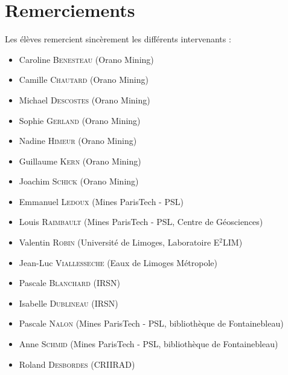 \documentclass{article}
\begin{document}
\section*{Remerciements}
Les élèves remercient sincèrement les différents intervenants : 
\begin{itemize}
    \item Caroline \textsc{Benesteau} (Orano Mining)
    \item Camille \textsc{Chautard} (Orano Mining)
    \item Michael \textsc{Descostes} (Orano Mining)    
    \item Sophie \textsc{Gerland} (Orano Mining)
    \item Nadine \textsc{Himeur} (Orano Mining)
    \item Guillaume \textsc{Kern} (Orano Mining)
    \item Joachim \textsc{Schick} (Orano Mining)
    \item Emmanuel \textsc{Ledoux} (Mines ParisTech - PSL)
    \item Louis \textsc{Raimbault} (Mines ParisTech - PSL, Centre de Géosciences) 
    \item Valentin \textsc{Robin} (Université de Limoges, Laboratoire E$^2$LIM) 
    \item Jean-Luc \textsc{Viallesseche} (Eaux de Limoges Métropole)
    \item Pascale \textsc{Blanchard} (IRSN)  
    \item Isabelle \textsc{Dublineau} (IRSN)    
    \item Pascale \textsc{Nalon} (Mines ParisTech - PSL, bibliothèque de Fontainebleau)
    \item Anne \textsc{Schmid} (Mines ParisTech - PSL, bibliothèque de Fontainebleau)
    \item Roland \textsc{Desbordes} (CRIIRAD)
\end{itemize}
\end{document}
